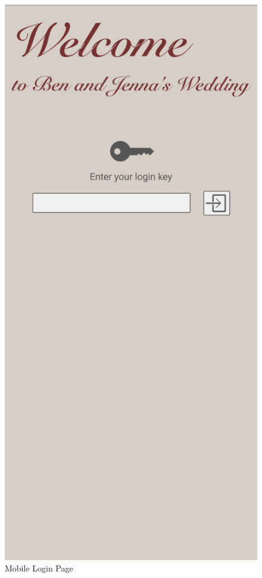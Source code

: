 \documentclass[onecolumn, draftclsnofoot,10pt, compsoc]{IEEEtran}
\begin{document}
        \begin{figure}[H]
            \includegraphics[scale=0.4]{Images/mobile-login.png}
            \centering\caption{Mobile Login Page}

\end{figure}
\end{document}
